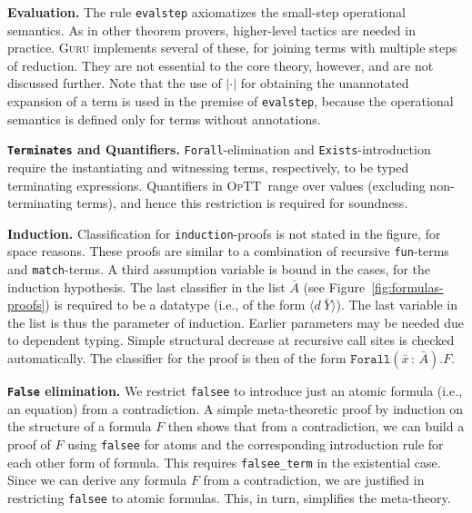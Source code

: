 \documentclass{fundam}
\newcommand{\optt}{\textsc{OpTT}}
\begin{document}
\textbf{Evaluation.} The rule \texttt{evalstep} axiomatizes the
small-step operational semantics.  As in other theorem provers,
higher-level tactics are needed in practice.  \textsc{Guru} implements
several of these, for joining terms with multiple steps of reduction.
They are not essential to the core theory, however, and are not
discussed further.  Note that the use of $|\cdot|$ for obtaining the
unannotated expansion of a term is used in the premise of
\texttt{evalstep}, because the operational semantics is defined only
for terms without annotations.

\textbf{\texttt{Terminates} and Quantifiers.} \texttt{Forall}-elimination
and \texttt{Exists}-introduction require the instantiating and
witnessing terms, respectively, to be typed terminating expressions.
Quantifiers in \optt\ range over values (excluding non-terminating
terms), and hence this restriction is required for soundness.

\textbf{Induction.} Classification for \texttt{induction}-proofs is
not stated in the figure, for space reasons.  These proofs are similar
to a combination of recursive \texttt{fun}-terms and
\texttt{match}-terms.  A third assumption variable is bound in the
cases, for the induction hypothesis.  The last classifier in the list
$\bar{A}$ (see Figure~\ref{fig:formulas-proofs}) is required to be a
datatype (i.e., of the form $\langle d\ \bar{Y}\rangle$).  The last
variable in the list is thus the parameter of induction.  Earlier
parameters may be needed due to dependent typing.  Simple structural
decrease at recursive call sites is checked automatically.  The
classifier for the proof is then of the form
$\texttt{Forall}(\bar{x}\,:\,\bar{A}). F$.

\textbf{\texttt{False} elimination.} We restrict \texttt{falsee} to
introduce just an atomic formula (i.e., an equation) from a
contradiction.  A simple meta-theoretic proof by induction on the
structure of a formula $F$ then shows that from a contradiction, we
can build a proof of $F$ using \texttt{falsee} for atoms and the
corresponding introduction rule for each other form of formula.  This
requires \texttt{falsee\_term} in the existential case.  Since we can
derive any formula $F$ from a contradiction, we are justified in
restricting \texttt{falsee} to atomic formulas.  This, in turn,
simplifies the meta-theory.
\end{document}
